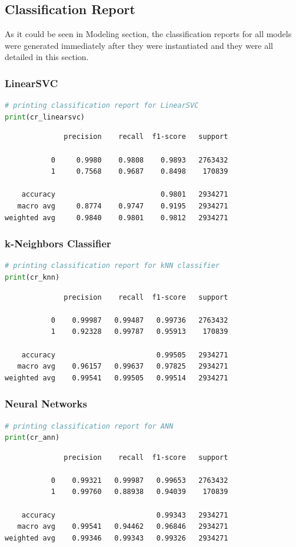 \documentclass{article}
\begin{document}
\subsection{Classification Report}

As it could be seen in Modeling section, the classification reports for all models were generated immediately after they were instantiated and they were all detailed in this section.

\subsubsection{LinearSVC}
\begin{lstlisting}[language=Python]
# printing classification report for LinearSVC
print(cr_linearsvc)
\end{lstlisting}
\begin{verbatim}  
              precision    recall  f1-score   support

           0     0.9980    0.9808    0.9893   2763432
           1     0.7568    0.9687    0.8498    170839

    accuracy                         0.9801   2934271
   macro avg     0.8774    0.9747    0.9195   2934271
weighted avg     0.9840    0.9801    0.9812   2934271
\end{verbatim}

\subsubsection{k-Neighbors Classifier}
\begin{lstlisting}[language=Python]
# printing classification report for kNN classifier
print(cr_knn)
\end{lstlisting}
\begin{verbatim}  
              precision    recall  f1-score   support

           0    0.99987   0.99487   0.99736   2763432
           1    0.92328   0.99787   0.95913    170839

    accuracy                        0.99505   2934271
   macro avg    0.96157   0.99637   0.97825   2934271
weighted avg    0.99541   0.99505   0.99514   2934271
\end{verbatim}

\subsubsection{Neural Networks}
\begin{lstlisting}[language=Python]
# printing classification report for ANN
print(cr_ann)
\end{lstlisting}
\begin{verbatim}    
              precision    recall  f1-score   support

           0    0.99321   0.99987   0.99653   2763432
           1    0.99760   0.88938   0.94039    170839

    accuracy                        0.99343   2934271
   macro avg    0.99541   0.94462   0.96846   2934271
weighted avg    0.99346   0.99343   0.99326   2934271
\end{verbatim}
\end{document}
